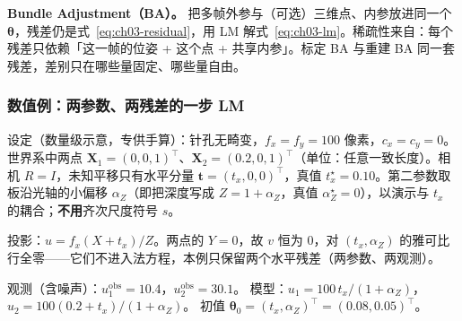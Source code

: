 \textbf{Bundle Adjustment（BA）。} 把多帧外参与（可选）三维点、内参放进同一个 $\boldsymbol\theta$，残差仍是式~\eqref{eq:ch03-residual}，用 LM 解式~\eqref{eq:ch03-lm}。稀疏性来自：每个残差只依赖「这一帧的位姿 + 这个点 + 共享内参」。标定 BA 与重建 BA 同一套残差，差别只在哪些量固定、哪些量自由。

\subsubsection{数值例：两参数、两残差的一步 LM}
\label{sec:ch03-numeric}

设定（数量级示意，专供手算）：针孔无畸变，$f_x=f_y=100$ 像素，$c_x=c_y=0$。世界系中两点 $\boldsymbol X_1=(0,0,1)^\top$、$\boldsymbol X_2=(0.2,0,1)^\top$（单位：任意一致长度）。相机 $R=I$，未知平移只有水平分量 $\boldsymbol t=(t_x,0,0)^\top$，真值 $t_x^\star=0.10$。第二参数取板沿光轴的小偏移 $\alpha_Z$（即把深度写成 $Z=1+\alpha_Z$，真值 $\alpha_Z^\star=0$），以演示与 $t_x$ 的耦合；\textbf{不用}齐次尺度符号 $s$。

投影：$u=f_x(X+t_x)/Z$。两点的 $Y=0$，故 $v$ 恒为 $0$，对 $(t_x,\alpha_Z)$ 的雅可比行全零——它们不进入法方程，本例只保留两个水平残差（两参数、两观测）。

观测（含噪声）：$u_1^{\mathrm{obs}}=10.4$，$u_2^{\mathrm{obs}}=30.1$。
模型：$u_1=100\,t_x/(1+\alpha_Z)$，$u_2=100(0.2+t_x)/(1+\alpha_Z)$。
初值 $\boldsymbol\theta_0=(t_x,\alpha_Z)^\top=(0.08,0.05)^\top$。

